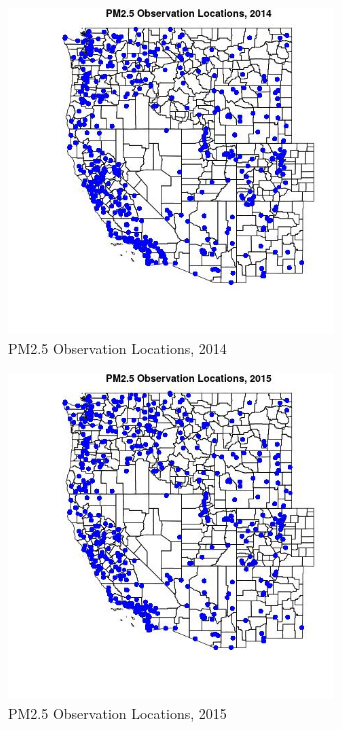 \begin{figure} 
\centering  
\includegraphics[width=0.77\textwidth]{Code_Outputs/Report_PM25_Step4_part_e_de_duplicated_aves_prioritize_24hr_obs_ML_input_PlotLoc2014.jpg} 
\caption{\label{fig:Report_PM25_Step4_part_e_de_duplicated_aves_prioritize_24hr_obs_ML_inputPlotLoc2014}PM2.5 Observation Locations, 2014} 
\end{figure} 
 

\begin{figure} 
\centering  
\includegraphics[width=0.77\textwidth]{Code_Outputs/Report_PM25_Step4_part_e_de_duplicated_aves_prioritize_24hr_obs_ML_input_PlotLoc2015.jpg} 
\caption{\label{fig:Report_PM25_Step4_part_e_de_duplicated_aves_prioritize_24hr_obs_ML_inputPlotLoc2015}PM2.5 Observation Locations, 2015} 
\end{figure} 
 

